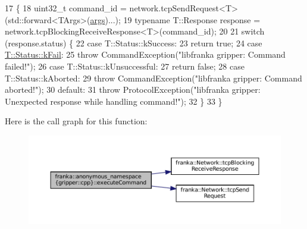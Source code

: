 \begin{DoxyCode}
17                                                        \{
18   uint32\_t command\_id = network.tcpSendRequest<T>(std::forward<TArgs>(\hyperlink{namespacegenerate__debs_a75f9143e38df82d83b2e8a6f99cae02c}{args})...);
19   \textcolor{keyword}{typename} T::Response response = network.tcpBlockingReceiveResponse<T>(command\_id);
20 
21   \textcolor{keywordflow}{switch} (response.status) \{
22     \textcolor{keywordflow}{case} T::Status::kSuccess:
23       \textcolor{keywordflow}{return} \textcolor{keyword}{true};
24     \textcolor{keywordflow}{case} \hyperlink{namespacetesting_1_1internal_adfcd859062983a889f4bd18e6977357ea6fc25174a501f31b090a2b556f77fdc1}{T::Status::kFail}:
25       \textcolor{keywordflow}{throw} CommandException(\textcolor{stringliteral}{"libfranka gripper: Command failed!"});
26     \textcolor{keywordflow}{case} T::Status::kUnsuccessful:
27       \textcolor{keywordflow}{return} \textcolor{keyword}{false};
28     \textcolor{keywordflow}{case} T::Status::kAborted:
29       \textcolor{keywordflow}{throw} CommandException(\textcolor{stringliteral}{"libfranka gripper: Command aborted!"});
30     \textcolor{keywordflow}{default}:
31       \textcolor{keywordflow}{throw} ProtocolException(\textcolor{stringliteral}{"libfranka gripper: Unexpected response while handling command!"});
32   \}
33 \}
\end{DoxyCode}
Here is the call graph for this function\+:
\nopagebreak
\begin{figure}[H]
\begin{center}
\leavevmode
\includegraphics[width=350pt]{namespacefranka_1_1anonymous__namespace_02gripper_8cpp_03_a024993add0f6393c296d96275f33b2dc_cgraph}
\end{center}
\end{figure}
